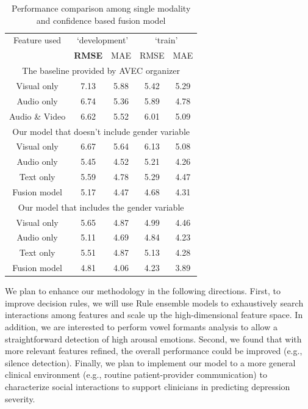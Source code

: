 \documentclass[letterpaper]{article} %
\begin{document}
\begin{table}[thp]
\caption{Performance comparison among single modality and confidence based fusion model}
\centering
\label{tab:perf_fusion}
\begin{tabular}{  c| c c | c c }
\hline
Feature used & \multicolumn{2}{c}{`development'} & \multicolumn{2}{c}{`train'} \\
& \textbf{RMSE} & MAE & RMSE & MAE \\
\hline \hline
\multicolumn{5}{c}{The baseline provided by AVEC organizer} \\
\hline
Visual only & 7.13 & 5.88 & 5.42 & 5.29 \\
Audio only & 6.74 & 5.36 & 5.89 & 4.78 \\
Audio \& Video & 6.62 & 5.52 & 6.01 & 5.09 \\
\hline
\multicolumn{5}{c}{Our model that doesn't include gender variable} \\
\hline
Visual only & 6.67 & 5.64 & 6.13 & 5.08 \\
Audio only & 5.45 & 4.52 & 5.21 & 4.26 \\
Text only & 5.59 & 4.78 & 5.29 & 4.47 \\
Fusion model & 5.17 & 4.47 & 4.68 & 4.31 \\
\hline
\multicolumn{5}{c}{Our model that includes the gender variable} \\
\hline
Visual only & 5.65 & 4.87 & 4.99 & 4.46 \\
Audio only & 5.11 & 4.69 & 4.84 & 4.23 \\
Text only & 5.51 & 4.87 & 5.13 & 4.28 \\
Fusion model & 4.81 & 4.06 & 4.23 & 3.89 \\
\hline
\end{tabular}
\end{table}

\vspace{-2.31mm}
We plan to enhance our methodology in the following directions. First, to improve decision rules, we will use Rule ensemble models to exhaustively search interactions among features and scale up the high-dimensional feature space. In addition, we are interested to perform vowel formants analysis to allow a straightforward detection of high arousal emotions. Second, we found that with more relevant features refined, the overall performance could be improved (e.g.,  silence detection). Finally, we plan to implement our model to a more general clinical environment (e.g., routine patient-provider communication) to characterize social interactions to support clinicians in predicting depression severity.
\end{document}
